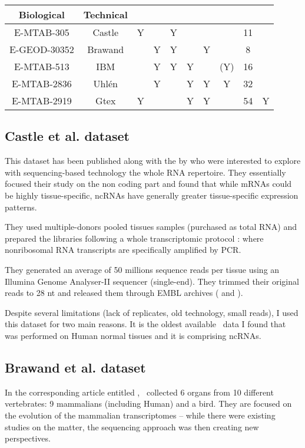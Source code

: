 \begin{sidewaystable}
\begin{tabular}{@{}cccccccccc@{}}
     \multicolumn{1}{c|}{Biological} & \multicolumn{1}{c|}{Technical} &
     \multicolumn{1}{c|}{} &  \\
\midrule
E-MTAB-305 & Castle & Y &  & Y &  &  &  & 11 &  \\
E-GEOD-30352 & Brawand &  & Y & Y &  & Y &  & 8 &  \\
E-MTAB-513 & IBM &  & Y & Y & Y &  & (Y) & 16 &  \\
E-MTAB-2836 & Uhlén &  & Y &  & Y & Y & Y & 32 &  \\
E-MTAB-2919 & Gtex  & Y &  &  & Y & Y &  & 54 & Y \\
\bottomrule
\end{tabular}
\end{sidewaystable}


\subsection{Castle et al. dataset}

This dataset has been published along with the 
by \citet{castleData} who were interested to explore
with sequencing-based technology the whole RNA repertoire. They essentially
focused their study on the non coding part and found that
while \glspl{mRNA} could be highly tissue-specific, \glspl{ncRNA} have generally
greater tissue-specific expression patterns.

They used multiple-donors pooled tissues samples (purchased as total \gls{RNA})
and prepared the libraries following a whole transcriptomic protocol
\citep{Armour:2009}: where nonribosomal \gls{RNA} transcripts are
specifically amplified by \gls{PCR}.

They generated an average of 50 millions sequence reads per tissue
using an Illumina Genome Analyser-II sequencer (single-end).
They trimmed their original reads to 28 \gls{nt}
and released them through EMBL archives (
and ).

Despite several limitations (lack of replicates, old technology, small reads),
I used this dataset for two main reasons. It is the oldest available \Rnaseq\
data I found that was performed on Human normal tissues and it is comprising
\glspl{ncRNA}.


\subsection{Brawand et al. dataset}

In the corresponding article entitled ,
\citet{VTpaper}~collected 6 organs from 10 different vertebrates:
9 mammalians (including Human) and a bird. They are focused on the
evolution of the mammalian transcriptomes -- while there were existing studies
on the matter, the sequencing approach was then creating new perspectives.

